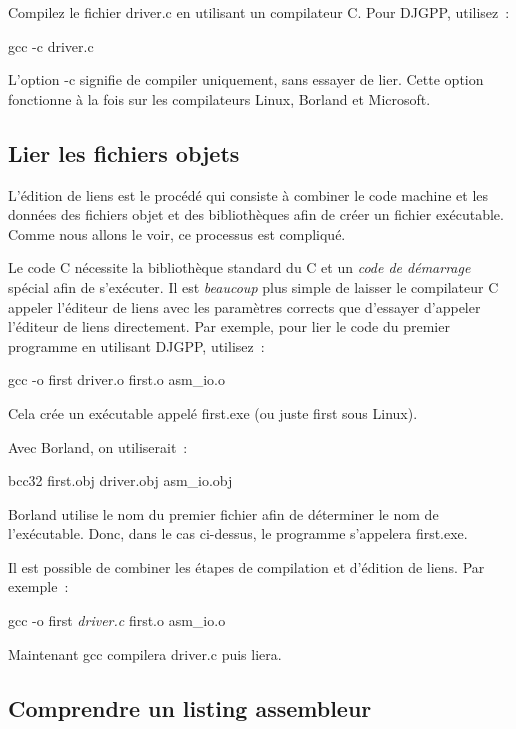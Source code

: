 {Compilez le fichier {\code driver.c} en utilisant un compilateur C. Pour DJGPP, utilisez~:
\begin{CodeQuote}
gcc -c driver.c
\end{CodeQuote}
L'option {\code -c} signifie de compiler uniquement, sans essayer de lier.
Cette option fonctionne à la fois sur les compilateurs Linux, Borland et Microsoft.

\subsection{Lier les fichiers objets\label{seq:linking} }

L'édition de liens est le procédé qui consiste à combiner le code machine
et les données des fichiers objet et des bibliothèques afin de créer
un fichier exécutable. Comme nous allons le voir, ce processus est
compliqué.

Le code C nécessite la bibliothèque standard du C et un \emph{code de démarrage}
spécial afin de s'exécuter. Il est \emph{beaucoup} plus simple de laisser le
compilateur C appeler l'éditeur de liens avec les paramètres corrects que
d'essayer d'appeler l'éditeur de liens directement. Par exemple, pour lier
le code du premier programme en utilisant DJGPP,  utilisez~:
\begin{CodeQuote}
gcc -o first driver.o first.o asm\_io.o
\end{CodeQuote}
Cela crée un exécutable appelé {\code first.exe} (ou juste {\code first}
sous Linux). 

Avec Borland,  on utiliserait~:
\begin{CodeQuote}
bcc32 first.obj driver.obj asm\_io.obj
\end{CodeQuote}
Borland utilise le nom du premier fichier afin de déterminer le nom de l'exécutable.
Donc, dans le cas ci-dessus, le programme s'appelera {\code first.exe}.

Il est possible de combiner les étapes de compilation et d'édition de liens.
Par exemple~:
\begin{CodeQuote}
gcc -o first {\em driver.c} first.o asm\_io.o
\end{CodeQuote}
Maintenant {\code gcc} compilera {\code driver.c} puis liera.

\subsection{Comprendre un listing assembleur}

}
